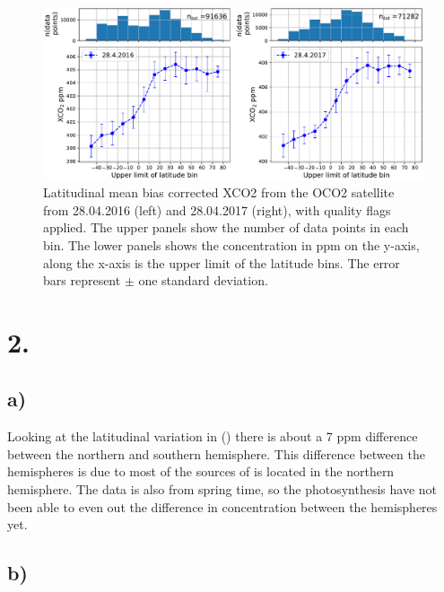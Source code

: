 \begin{figure}[htbp]
    \centering
    \includegraphics[width=\textwidth]{../qa_xCO2.pdf}
    \caption{Latitudinal mean bias corrected XCO2 from the OCO2 satellite from 28.04.2016 (left) 
    and 28.04.2017 (right), with quality flags applied. The upper panels 
    show the number of data points in each bin. The lower panels shows the  
    concentration in ppm on the y-axis, along the x-axis is the upper limit of
    the latitude bins. The error bars represent $\pm$ one standard deviation.}
    \label{fig:qa_xco2}

\end{figure}


\section*{2.}

\subsection*{a)}

Looking at the latitudinal variation in  () there is about a 7 ppm
difference between the northern and southern hemisphere. This difference between
the hemispheres is due to most of the sources of  is located in the
northern hemisphere. The data is also from spring time, so the photosynthesis
have not been able to even out the difference in  concentration between
the hemispheres yet. 

\subsection*{b)}

